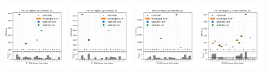 \begin{figure}
    \centering
    \includegraphics[width=0.24\textwidth]{appendices/ttSystReweighting/figures/afterCorr/icata0_ch0_isr.png}
    \includegraphics[width=0.24\textwidth]{appendices/ttSystReweighting/figures/afterCorr/icata0_ch1_isr.png}
    \includegraphics[width=0.24\textwidth]{appendices/ttSystReweighting/figures/afterCorr/icata0_ch2_isr.png}
    \includegraphics[width=0.24\textwidth]{appendices/ttSystReweighting/figures/afterCorr/icata0_ch3_isr.png}


\end{figure}
